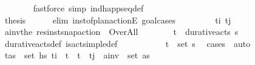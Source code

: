 \begin{isabellebody}
\ \ \ \ \ \ \isamarkupfalse%
\ {\isacharparenleft}{\kern0pt}fastforce\ simp{\isacharcolon}{\kern0pt}\ ind{\isacharunderscore}{\kern0pt}happ{\isacharunderscore}{\kern0pt}seq{\isacharunderscore}{\kern0pt}def{\isacharparenright}{\kern0pt}\ \ \ \ \ \ \ \ \ \ \ \ \ \ \ \ \ \ \ \ \ \ \ \ \ \ \ \ \ \ \isanewline
\ \ \ \ \isamarkupfalse%
\ \isamarkupfalse%
\ {\isacharquery}{\kern0pt}thesis\isanewline
\ \ \ \ \isamarkupfalse%
\ {\isacharparenleft}{\kern0pt}elim\ inst{\isacharunderscore}{\kern0pt}of{\isacharunderscore}{\kern0pt}plan{\isacharunderscore}{\kern0pt}actionE{\isacharcomma}{\kern0pt}\ goal{\isacharunderscore}{\kern0pt}cases{\isacharparenright}{\kern0pt}\isanewline
\ \ \ \ \ \ \isamarkupfalse%
\ {\isacharparenleft}{\kern0pt}{}\ t\isactrlsub i{\isacharprime}{\kern0pt}\ t\isactrlsub j{\isacharprime}{\kern0pt}{\isacharparenright}{\kern0pt}\isanewline
\ \ \ \ \ \ \isamarkupfalse%
\ {\isacharquery}{\kern0pt}a\isactrlsub i\isactrlsub n\isactrlsub v{\isacharequal}{\kern0pt}{\isachardoublequoteopen}the\ {\isacharparenleft}{\kern0pt}res{\isacharunderscore}{\kern0pt}inst{\isacharunderscore}{\kern0pt}snap{\isacharunderscore}{\kern0pt}action\ {\isasympi}\ Over{\isacharunderscore}{\kern0pt}All{\isacharparenright}{\kern0pt}{\isachardoublequoteclose}\isanewline
\ \ \ \ \ \ \isamarkupfalse%
\ {\isachardoublequoteopen}{\isacharparenleft}{\kern0pt}t\isactrlsub {\isasympi}{\isacharcomma}{\kern0pt}{\isasympi}{\isacharparenright}{\kern0pt}\ {\isasymin}\ durative{\isacharunderscore}{\kern0pt}acts\ {\isasympi}s{\isachardoublequoteclose}\isanewline
\ \ \ \ \ \ \ \ \isamarkupfalse%
\ durative{\isacharunderscore}{\kern0pt}acts{\isacharunderscore}{\kern0pt}def\ is{\isacharunderscore}{\kern0pt}act{\isacharunderscore}{\kern0pt}simple{\isacharunderscore}{\kern0pt}def\isanewline
\ \ \ \ \ \ \ \ \isamarkupfalse%
\ {}\ {\isacartoucheopen}{\isacharparenleft}{\kern0pt}t\isactrlsub {\isasympi}{\isacharcomma}{\kern0pt}{\isasympi}{\isacharparenright}{\kern0pt}\ {\isasymin}\ set\ {\isasympi}s{\isacartoucheclose}\ \isamarkupfalse%
\ {\isacharparenleft}{\kern0pt}cases\ {\isasympi}{\isacharparenright}{\kern0pt}\ auto\isanewline
\ \ \ \ \ \ \isamarkupfalse%
\ \isamarkupfalse%
\ {\isachardoublequoteopen}{\isasymexists}{\isacharparenleft}{\kern0pt}t{\isacharprime}{\kern0pt}{\isacharcomma}{\kern0pt}as{\isacharparenright}{\kern0pt}\ {\isasymin}\ set\ hs\ t\isactrlsub i{\isacharprime}{\kern0pt}\ {\isacharless}{\kern0pt}\ t{\isacharprime}{\kern0pt}\ {\isasymand}\ t{\isacharprime}{\kern0pt}\ {\isacharless}{\kern0pt}\ t\isactrlsub j{\isacharprime}{\kern0pt}\ {\isasymand}\ {\isacharquery}{\kern0pt}a\isactrlsub i\isactrlsub n\isactrlsub v\ {\isasymin}\ set\ as{\isachardoublequoteclose}\isanewline

\end{isabellebody}
